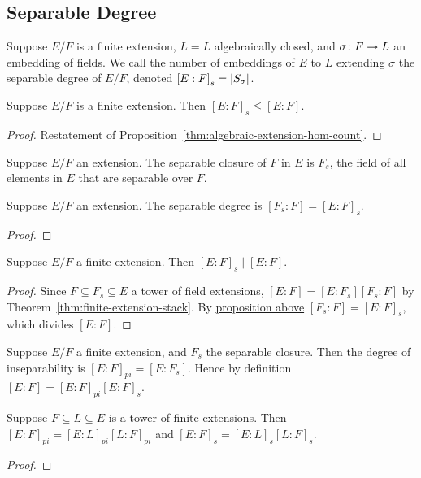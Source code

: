 \subsection*{Separable Degree}

\begin{definition}
    Suppose \(E/F\) is a finite extension,
    \(L = \overline{L}\) algebraically closed,
    and \(\sigma\colon F\to L\) an embedding of fields.
    We call the number of embeddings of \(E\) to \(L\) extending \(\sigma\)
    the separable degree of \(E/F\),
    denoted \({[E:F]}_s = \abs{S_\sigma}\).
\end{definition}
\begin{corollary}
    Suppose \(E/F\) is a finite extension.
    Then \({[E:F]}_s \leq [E:F]\).
\end{corollary}
\begin{proof}
    Restatement of Proposition~\ref{thm:algebraic-extension-hom-count}.
\end{proof}

\begin{definition}
    Suppose \(E/F\) an extension.
    The separable closure of \(F\) in \(E\) is \(F_s\),
    the field of all elements in \(E\) that are separable over \(F\).
\end{definition}
\begin{proposition}\label{prop:separable-degree}
    Suppose \(E/F\) an extension.
    The separable degree is \([F_s:F] = {[E:F]}_s\).
\end{proposition}
\begin{proof}
\end{proof}
\begin{corollary}
    Suppose \(E/F\) a finite extension.
    Then \({[E:F]}_s \mid [E:F]\).
\end{corollary}
\begin{proof}
    Since \(F \subseteq F_s \subseteq E\) a tower of field extensions,
    \([E:F] = [E:F_s][F_s:F]\) by Theorem~\ref{thm:finite-extension-stack}.
    By \hyperref[prop:separable-degree]{proposition above}
    \([F_s:F] = {[E:F]}_s\), which divides \([E:F]\).
\end{proof}

\begin{definition}
    Suppose \(E/F\) a finite extension,
    and \(F_s\) the separable closure.
    Then the degree of inseparability is \({[E:F]}_{pi} = [E:F_s]\).
    Hence by definition \([E:F] = {[E:F]}_{pi}{[E:F]}_s\).
\end{definition}
\begin{proposition}
    Suppose \(F \subseteq L \subseteq E\) is a tower of finite extensions.
    Then \({[E:F]}_{pi} = {[E:L]}_{pi}{[L:F]}_{pi}\)
    and \({[E:F]}_s = {[E:L]}_s{[L:F]}_s\).
\end{proposition}
\begin{proof}
\end{proof}

